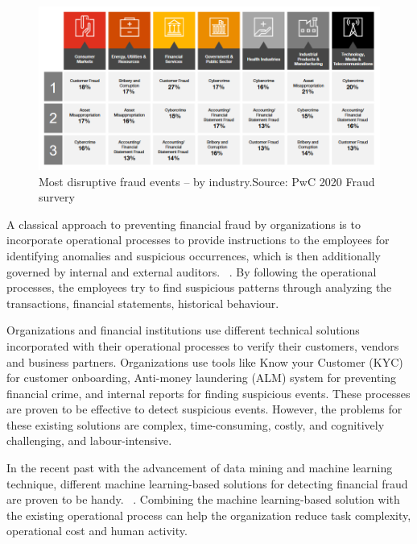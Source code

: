 \begin{figure}[htp]
    \centering
    \includegraphics[width=\linewidth]{figures/fraud_by_industry.PNG}
    \caption{Most disruptive fraud events – by industry.Source: PwC 2020 Fraud survery~\cite{PwC.Crime.Survey} }
    \label{fig:fraud_sector}
\end{figure}



A classical approach to preventing financial fraud by organizations is to incorporate operational processes to provide instructions to the employees for identifying anomalies and suspicious occurrences, which is then additionally governed by internal and external auditors. ~\cite{kassem_2014}. By following the operational processes, the employees try to find suspicious patterns through analyzing the transactions, financial statements, historical behaviour. 



Organizations and financial institutions use different technical solutions incorporated with their operational processes to verify their customers, vendors and business partners. Organizations use tools like Know your Customer (KYC) for customer onboarding, Anti-money laundering (ALM) system for preventing financial crime, and internal reports for finding suspicious events. These processes are proven to be effective to detect suspicious events. However, the problems for these existing solutions are complex, time-consuming, costly, and cognitively challenging, and labour-intensive.


In the recent past with the advancement of data mining and machine learning technique, different machine learning-based solutions for detecting financial fraud are proven to be handy. ~\cite{RB2021, KIRKOS2007995}. Combining the machine learning-based solution with the existing operational process can help the organization reduce task complexity, operational cost and human activity. 


